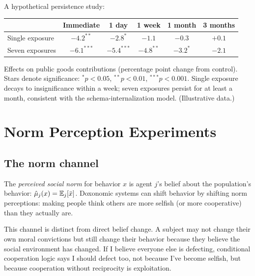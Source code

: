 \begin{example}
\label{ex:persistence}
A hypothetical persistence study:
\begin{center}
\begin{tabular}{lccccc}
\toprule
& Immediate & 1 day & 1 week & 1 month & 3 months \\
\midrule
Single exposure & $-4.2^{**}$ & $-2.8^{*}$ & $-1.1$ & $-0.3$ & $+0.1$ \\
Seven exposures & $-6.1^{***}$ & $-5.4^{***}$ & $-4.8^{**}$ & $-3.2^{*}$ & $-2.1$ \\
\bottomrule
\end{tabular}
\end{center}
Effects on public goods contributions (percentage point change from control).
Stars denote significance: $^{*}p < 0.05$, $^{**}p < 0.01$, $^{***}p < 0.001$.
Single exposure decays to insignificance within a week; seven exposures persist for at least a month, consistent with the schema-internalization model.
(Illustrative data.)
\end{example}

\section{Norm Perception Experiments}
\label{sec:ch19-norms}

\subsection{The norm channel}

\begin{definition}
\label{def:perceived-norm}
The \emph{perceived social norm} for behavior $x$ is agent $j$'s belief about the population's behavior: $\hat{\mu}_j(x) = \mathbb{E}_j[\bar{x}]$.
Doxonomic systems can shift behavior by shifting norm perceptions: making people think others are more selfish (or more cooperative) than they actually are.
\end{definition}

This channel is distinct from direct belief change.
A subject may not change their own moral convictions but still change their behavior because they believe the social environment has changed.
If I believe everyone else is defecting, conditional cooperation logic says I should defect too, not because I've become selfish, but because cooperation without reciprocity is exploitation.

